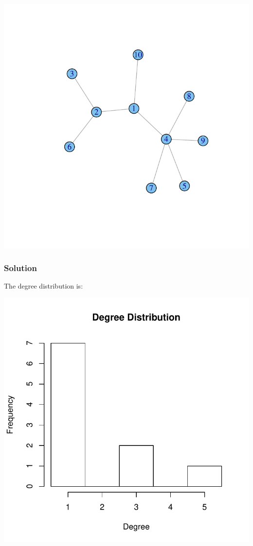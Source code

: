\documentclass{uws_learning_guide}
\begin{document}
\vspace{-6em}
\begin{center}
\includegraphics{bnetwork}
\end{center}

\vspace{-14em}
\subsubsection*{Solution}

The degree distribution is:
\begin{center}
\includegraphics[scale=0.7]{bnetwork-dist}
\end{center}
\end{document}
